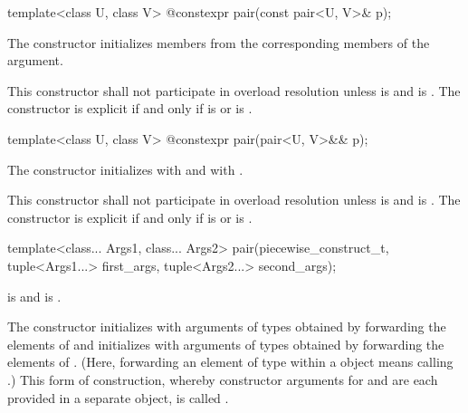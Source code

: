 %
\begin{itemdecl}
template<class U, class V> @\EXPLICIT@ constexpr pair(const pair<U, V>& p);
\end{itemdecl}

\begin{itemdescr}
\pnum
\effects
The constructor initializes members from the corresponding members of the argument.

\pnum
\remarks This constructor shall not participate in overload resolution unless
 is  and
 is .
The constructor is explicit if and only if
 is  or
 is .
\end{itemdescr}

%
\begin{itemdecl}
template<class U, class V> @\EXPLICIT@ constexpr pair(pair<U, V>&& p);
\end{itemdecl}

\begin{itemdescr}
\pnum
\effects
The constructor initializes  with
and  with
.

\pnum
\remarks This constructor shall not participate in overload resolution unless
 is  and
 is .
The constructor is explicit if and only if
 is  or
 is .
\end{itemdescr}

%
\begin{itemdecl}
template<class... Args1, class... Args2>
  pair(piecewise_construct_t,
       tuple<Args1...> first_args, tuple<Args2...> second_args);
\end{itemdecl}

\begin{itemdescr}
\pnum
\requires {} is 
and  is .

\pnum
\effects The constructor initializes  with arguments of types
 obtained by forwarding the elements of 
and initializes  with arguments of types 
obtained by forwarding the elements of . (Here, forwarding
an element  of type  within a  object means calling
.) This form of construction, whereby constructor
arguments for  and  are each provided in a separate
 object, is called .
\end{itemdescr}

